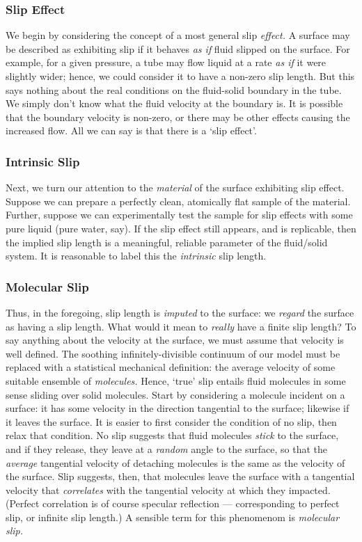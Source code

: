 \documentclass[12pt, a4paper, twoside, openright]{book}
\begin{document}
\subsubsection*{Slip Effect}

We begin by considering the concept of a most general slip \emph{effect.} A surface may be described as exhibiting slip if it behaves \emph{as if} fluid slipped on the surface.  For example, for a given pressure, a tube may flow liquid at a rate \emph{as if} it were slightly wider; hence, we could consider it to have a non-zero slip length. But this says nothing about the real conditions on the fluid-solid boundary in the tube. We simply don't know what the fluid velocity at the boundary is. It is possible that the boundary velocity is non-zero, or there may be other effects causing the increased flow. All we can say is that there is a `slip effect'.

\subsubsection*{Intrinsic Slip}

Next, we turn our attention to the \emph{material} of the surface exhibiting  slip effect. Suppose we can prepare a perfectly clean, atomically flat sample of the material. Further, suppose we can experimentally test the sample for slip effects with some pure liquid (pure water, say). If the slip effect still appears, and is replicable, then the implied slip length is a meaningful, reliable parameter of the fluid/solid system. It is reasonable to label this the \emph{intrinsic} slip length.

\subsubsection*{Molecular Slip}

Thus, in the foregoing, slip length is \emph{imputed} to the surface: we \emph{regard} the surface as having a slip length. What would it mean to \emph{really} have a finite slip length? To say anything about the velocity at the surface, we must assume that velocity is well defined. The soothing infinitely-divisible continuum of our model must be replaced with a statistical mechanical definition: the average velocity of some suitable ensemble of \emph{molecules.} Hence, `true' slip entails fluid molecules in some sense sliding over solid molecules. Start by considering a molecule incident on a surface: it has some velocity in the direction tangential to the surface; likewise if it leaves the surface. It is easier to first consider the condition of no slip, then relax that condition. No slip suggests that fluid molecules \emph{stick} to the surface, and if they release, they leave at a \emph{random} angle to the surface, so that the \emph{average} tangential velocity of detaching molecules is the same as the velocity of the surface. Slip suggests, then, that molecules leave the surface with a tangential velocity that \emph{correlates} with the tangential velocity at which they impacted. (Perfect correlation is of course specular reflection --- corresponding to perfect slip, or infinite slip length.) A sensible term for this phenomenom is \emph{molecular slip.}
\end{document}
